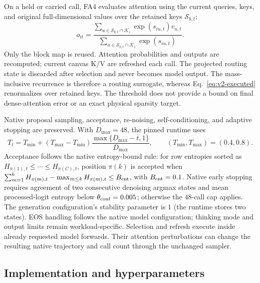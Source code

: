 On a held or carried call, FA4 evaluates attention using the current
queries, keys, and original full-dimensional values over the retained keys
$\mathcal S_{b,t}$:
\begin{equation}
 o_{it}=\frac{\sum_{u\in\mathcal S_{b,t}\cap\mathcal K_i}
                     \exp(s_{iu,t})v_{u,t}}
                  {\sum_{u\in\mathcal S_{b,t}\cap\mathcal K_i}
                     \exp(s_{iu,t})}.
 \label{eq:v2-executed}
\end{equation}
Only the block map is reused. Attention probabilities and outputs are
recomputed; current canvas K/V are refreshed each call. The projected
routing state is discarded after selection and never becomes model output.
The mass-inclusive recurrence is therefore a routing surrogate, whereas
Eq.~\eqref{eq:v2-executed} renormalizes over retained keys. The threshold
does not provide a bound on final dense-attention error or an exact physical
sparsity target.

Native proposal sampling, acceptance, re-noising, self-conditioning, and
adaptive stopping are preserved. With $D_{\max}=48$, the pinned runtime uses
\begin{equation}
 T_t=T_{\min}+(T_{\max}-T_{\min})
       \frac{\max\{D_{\max}-t,1\}}{D_{\max}},
 \qquad (T_{\min},T_{\max})=(0.4,0.8).
 \label{eq:v2-temperature}
\end{equation}
Acceptance follows the native entropy-bound rule: for row entropies sorted
as $H_{\pi(1),t}\le\cdots\le H_{\pi(C),t}$, position $\pi(k)$ is accepted
when $\sum_{m=1}^{k}H_{\pi(m),t}-\max_{m\le k}H_{\pi(m),t}\le B_{\rm ent}$,
with $B_{\rm ent}=0.1$. Native early stopping requires agreement of two
consecutive denoising argmax states and mean processed-logit entropy below
$\theta_{\rm conf}=0.005$; otherwise the $48$-call cap applies. The generation
configuration's stability parameter is $1$ (the runtime stores two states).
EOS handling follows the native model configuration; thinking mode and
output limits remain workload-specific. Selection and refresh execute
inside already requested model forwards. Their attention perturbations can
change the resulting native trajectory and call count through the unchanged
sampler.

\subsection{Implementation and hyperparameters}
\label{sec:v2-implementation}

